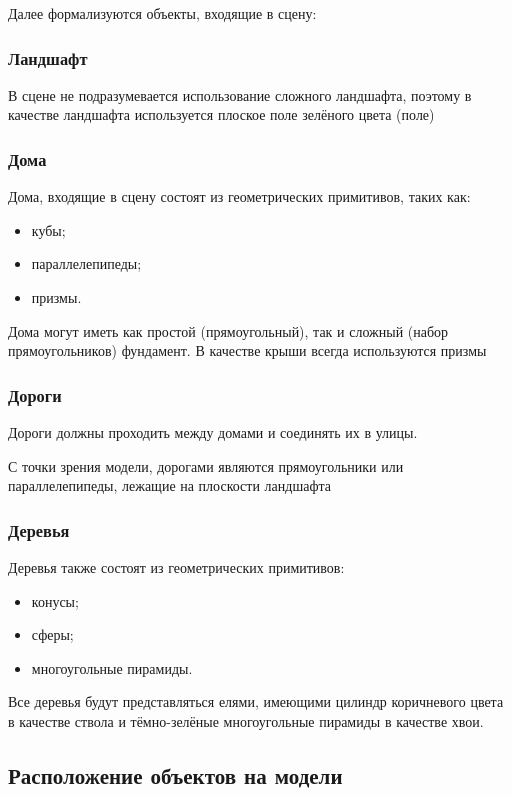 Далее формализуются объекты, входящие в сцену:

\subsubsection{Ландшафт}

В сцене не подразумевается использование сложного ландшафта, поэтому в качестве ландшафта используется плоское поле зелёного цвета (поле)

\subsubsection{Дома}

Дома, входящие в сцену состоят из геометрических примитивов, таких как:
\begin{itemize}
    \item кубы;
    \item параллелепипеды;
    \item призмы.
\end{itemize}

Дома могут иметь как простой (прямоугольный), так и сложный (набор прямоугольников) фундамент. В качестве крыши всегда используются призмы 

\subsubsection{Дороги}

Дороги должны проходить между домами и соединять их в улицы. 

С точки зрения модели, дорогами являются прямоугольники или параллелепипеды, лежащие на плоскости ландшафта

\subsubsection{Деревья}

Деревья также состоят из геометрических примитивов:
\begin{itemize}
    \item конусы;
    \item сферы;
    \item многоугольные пирамиды.
\end{itemize}

Все деревья будут представляться елями, имеющими цилиндр коричневого цвета в качестве ствола и тёмно-зелёные многоугольные пирамиды в качестве хвои.

\subsection{Расположение объектов на модели}

